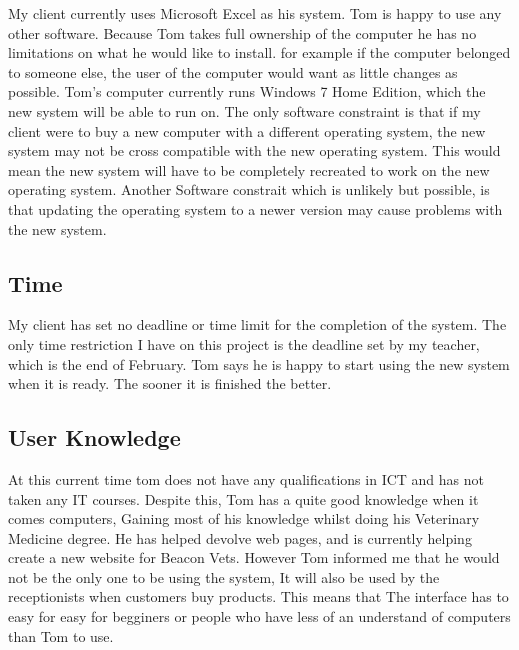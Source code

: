 \begin{flushleft}
My client currently uses Microsoft Excel as his system. Tom is happy to use any other software. Because Tom takes full ownership of the computer he has no limitations on what he would like to install. for example if the computer belonged to someone else, the user of the computer would want as little changes as possible. Tom's computer currently runs Windows 7 Home Edition, which the new system will be able to run on. The only software constraint is that if my client were to buy a new computer with a different operating system, the new system may not be cross compatible with the new operating system. This would mean the new system will have to be completely recreated to work on the new operating system. Another Software constrait which is unlikely but possible, is that updating the operating system to a newer version may cause problems with the new system.
\end{flushleft}

\subsection{Time}

\begin{flushleft}
My client has set no deadline or time limit for the completion of the system. The only time restriction I have on this project is the deadline set by my teacher, which is the end of February. Tom says he is happy to start using the new system when it is ready. The sooner it is finished the better.
\end{flushleft}

\subsection{User Knowledge}

\begin{flushleft}
At this current time tom does not have any qualifications in ICT and has not taken any IT courses. Despite this, Tom has a quite good knowledge when it comes computers, Gaining most of his knowledge whilst doing his Veterinary Medicine degree. He has helped devolve web pages, and is currently helping create a new website for Beacon Vets. However Tom informed me that he would not be the only one to be using the system, It will also be used by the receptionists when customers buy products. This means that The interface has to easy for easy for begginers or people who have less of an understand of computers than Tom to use. 
\end{flushleft}

